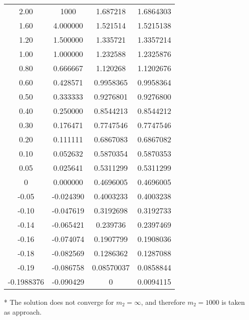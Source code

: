 \begin{threeparttable}
\begin{tabular}{S[table-format=-1.7] S[table-format=4.6] S[table-format=1.8] S[table-format=1.7]}
         2.00       &   1000\tnote{*}  &  1.687218   &  1.6864303 \\
         1.60       &   4.000000  &  1.521514   &  1.5215138 \\
         1.20       &   1.500000  &  1.335721   &  1.3357214 \\
         1.00       &   1.000000  &  1.232588   &  1.2325876 \\
         0.80       &   0.666667  &  1.120268   &  1.1202676 \\
         0.60       &   0.428571  &  0.9958365   &  0.9958364 \\
         0.50       &   0.333333  &  0.9276801   &  0.9276800 \\
         0.40       &   0.250000  &  0.8544213   &  0.8544212 \\
         0.30       &   0.176471  &  0.7747546   &  0.7747546 \\
         0.20       &   0.111111  &  0.6867083   &  0.6867082 \\
         0.10       &   0.052632  &  0.5870354   &  0.5870353 \\
         0.05       &   0.025641  &  0.5311299   &  0.5311299 \\
         0       &   0.000000  &  0.4696005   &  0.4696005 \\
         -0.05       &   -0.024390  &  0.4003233   &  0.4003238 \\
         -0.10       &   -0.047619  &  0.3192698   &  0.3192733 \\
         -0.14       &   -0.065421  &  0.239736   &  0.2397469 \\
         -0.16       &   -0.074074  &  0.1907799   &  0.1908036 \\
         -0.18       &   -0.082569  &  0.1286362   &  0.1287088 \\
         -0.19       &   -0.086758  &  0.08570037   &  0.0858844 \\
         -0.1988376       &   -0.090429  &  0   &  0.0094115 \\
        \bottomrule

    \end{tabular}
    \begin{tablenotes}
        \item[*] The solution does not converge for $m_2 = \infty$, and therefore $m_2 = 1000$ is taken as approach.
    \end{tablenotes}
\end{threeparttable}
